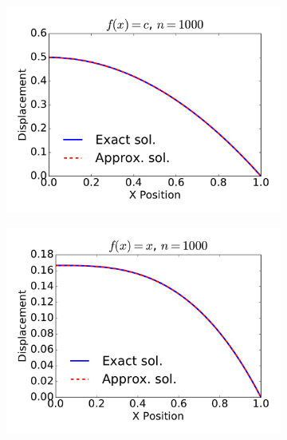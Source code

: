 \documentclass{article}
\begin{document}
\begin{figure}
        \begin{subfigure}[b]{0.33\textwidth}
                \includegraphics[width=\linewidth]{displacement_func0_Nell1000}
                \label{fig:gull}
        \end{subfigure}%
        \begin{subfigure}[b]{0.33\textwidth}
                \includegraphics[width=\linewidth]{displacement_func1_Nell1000}
                \label{fig:gull2}
        \end{subfigure}%
        \begin{subfigure}[b]{0.33\textwidth}

\end{subfigure}
\end{figure}
\end{document}
